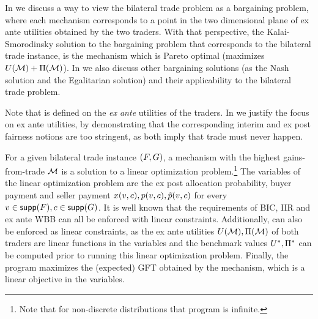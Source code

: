In  we discuss a way to view the bilateral trade problem as a bargaining problem, where each mechanism corresponds to a point in the two dimensional plane of ex ante utilities obtained by the two traders. With that perspective, the Kalai-Smorodinsky solution to the bargaining problem that corresponds to the bilateral trade instance, is the {\ksfair} mechanism which is Pareto optimal (maximizes $U(\mathcal{M})+\Pi(\mathcal{M})$). In  we also discuss other bargaining solutions (as the Nash solution and the Egalitarian solution) and their applicability to the bilateral trade problem. 


Note that {\ksfairness} is defined on the \emph{ex ante} utilities of the traders. In  we justify the focus on ex ante utilities, by demonstrating that the corresponding interim and ex post fairness notions are too stringent, as both imply that trade must never happen.

For a given bilateral trade instance $(F,G)$, a {\ksfair} mechanism with the highest gains-from-trade $\mathcal{M}$ is a solution to a linear optimization problem.\footnote{Note that for non-discrete distributions that program is infinite.} The variables of the linear optimization problem are  the {ex post} allocation probability, buyer payment and seller payment $x(v,c),p(v,c),\tilde{p}(v,c)$ for every $v\in {\sf supp}(F), c\in{\sf supp}(G)$. It is well known that the requirements of BIC, IIR and ex ante WBB can all be enforced with linear constraints. Additionally, {\ksfairness} can also be enforced {as linear constraints}, as the ex ante utilities $U(\mathcal{M}), \Pi(\mathcal{M})$ of both traders are linear functions in the variables and the benchmark values $U^*, \Pi^*$ can be computed prior to running this linear optimization problem. Finally, the program maximizes the (expected) GFT obtained by the mechanism, which is a linear objective in the variables.


